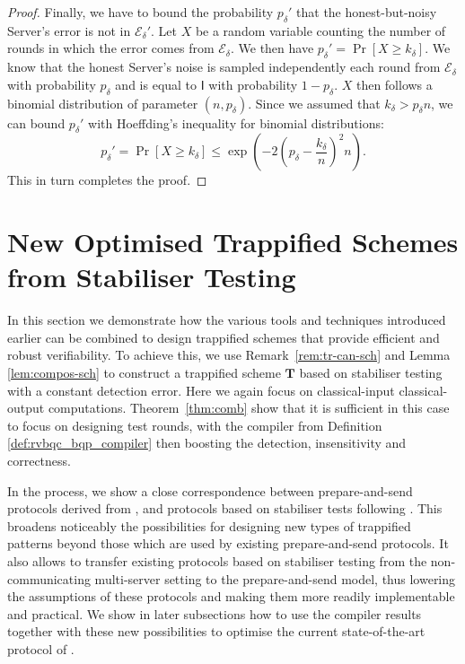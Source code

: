 \documentclass[12pt]{iopart}
\newcommand{\cptp}[1]{\mathsf{#1}} \newcommand{\pd}[1]{\mathcal{#1}}  \newcommand{\sch}[1]{\bm{#1}}
\newcommand{\Id}{\cptp{I}}
\renewcommand{\1}{\mathds{1}}
\begin{document}
\begin{proof}
Finally, we have to bound the probability $p_\delta'$ that the honest-but-noisy Server's error is not in $\mathcal{E}_\delta'$. Let $X$ be a random variable counting the number of rounds in which the error comes from $\mathcal E_\delta$. We then have $p_\delta' = \Pr[X \geq k_\delta]$. We know that the honest Server's noise is sampled independently each round from $\mathcal E_\delta$ with probability $p_\delta$ and is equal to $\Id$ with probability $1 - p_\delta$. $X$ then follows a binomial distribution of parameter $(n, p_\delta)$. Since we assumed that $k_\delta > p_\delta n$, we can bound $p_\delta'$ with Hoeffding's inequality for binomial distributions:
\begin{equation}
p_\delta' = \Pr[X \geq k_\delta] \leq \exp\left(- 2 \left(p_\delta - \frac{k_\delta}{n}\right)^2 n\right).
\end{equation}
This in turn completes the proof.
\end{proof}




 
\section{New Optimised Trappified Schemes from Stabiliser Testing}
\label{sec:new_traps}

In this section we demonstrate how the various tools and
techniques introduced earlier can be combined to design trappified
schemes that provide efficient and robust verifiability. To achieve
this, we use Remark~\ref{rem:tr-can-sch} and Lemma \ref{lem:compos-sch} to
construct a trappified scheme $\sch T$ based on stabiliser testing 
with a constant detection error.
Here we again focus on classical-input
classical-output computations.
Theorem~\ref{thm:comb} show that it is 
sufficient in this case to focus on designing test rounds, with the 
compiler from Definition \ref{def:rvbqc_bqp_compiler} then 
boosting the detection, insensitivity and correctness.

In the process, we show a close correspondence between prepare-and-send
protocols derived from \cite{FK17:unconditionally}, and protocols based on stabiliser tests
following \cite{M13:interactive}. This broadens noticeably the possibilities for designing new types of 
trappified patterns beyond those which are used by existing prepare-and-send protocols. 
It also allows to transfer existing protocols based on stabiliser testing from the 
non-communicating multi-server setting to the prepare-and-send model, thus lowering 
the assumptions of these protocols and making them more readily implementable and practical.
We show in later subsections how to use the compiler results together with these 
new possibilities to optimise the current state-of-the-art protocol of \cite{LMKO21:verifying}.
\end{document}
